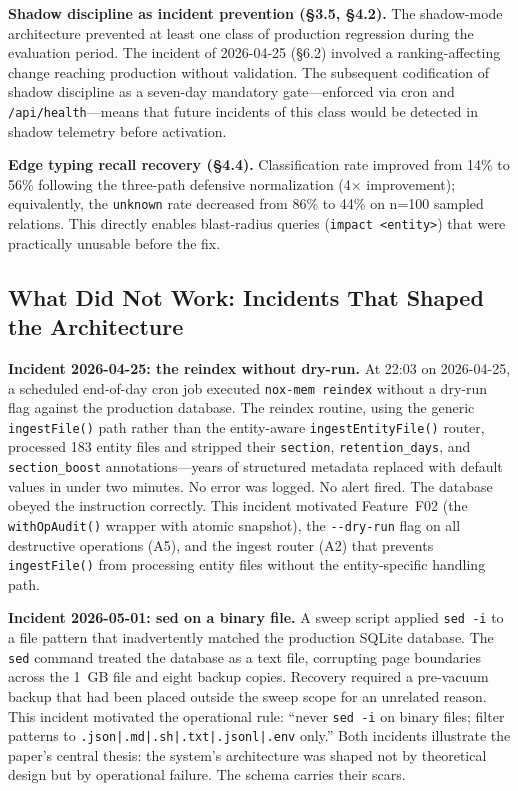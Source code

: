 \documentclass{article}
\begin{document}
\textbf{Shadow discipline as incident prevention (\S3.5, \S4.2).} The shadow-mode
architecture prevented at least one class of production regression during the evaluation
period. The incident of 2026-04-25 (\S6.2) involved a ranking-affecting change reaching
production without validation. The subsequent codification of shadow discipline as a
seven-day mandatory gate---enforced via cron and \texttt{/api/health}---means that future
incidents of this class would be detected in shadow telemetry before activation.

\textbf{Edge typing recall recovery (\S4.4).} Classification rate improved from 14\% to
56\% following the three-path defensive normalization (4$\times$ improvement);
equivalently, the \texttt{unknown} rate decreased from 86\% to 44\% on n=100 sampled
relations. This directly enables blast-radius queries (\texttt{impact~\textless entity\textgreater}) that were practically unusable before the fix.

\subsection{What Did Not Work: Incidents That Shaped the Architecture}

\textbf{Incident 2026-04-25: the reindex without dry-run.} At 22:03 on 2026-04-25, a
scheduled end-of-day cron job executed \texttt{nox-mem reindex} without a dry-run flag
against the production database. The reindex routine, using the generic
\texttt{ingestFile()} path rather than the entity-aware \texttt{ingestEntityFile()} router,
processed 183 entity files and stripped their \texttt{section}, \texttt{retention\_days},
and \texttt{section\_boost} annotations---years of structured metadata replaced with default
values in under two minutes. No error was logged. No alert fired. The database obeyed the
instruction correctly. This incident motivated Feature~F02 (the \texttt{withOpAudit()}
wrapper with atomic snapshot), the \texttt{-{}-dry-run} flag on all destructive operations
(A5), and the ingest router (A2) that prevents \texttt{ingestFile()} from processing entity
files without the entity-specific handling path.

\textbf{Incident 2026-05-01: sed on a binary file.} A sweep script applied
\texttt{sed~-i} to a file pattern that inadvertently matched the production SQLite
database. The \texttt{sed} command treated the database as a text file, corrupting page
boundaries across the 1~GB file and eight backup copies. Recovery required a pre-vacuum
backup that had been placed outside the sweep scope for an unrelated reason. This incident
motivated the operational rule: ``never \texttt{sed~-i} on binary files; filter patterns
to \texttt{.json|.md|.sh|.txt|.jsonl|.env} only.'' Both incidents illustrate the paper's
central thesis: the system's architecture was shaped not by theoretical design but by
operational failure. The schema carries their scars.
\end{document}
